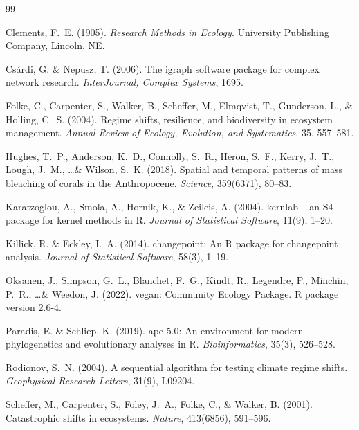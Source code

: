 \documentclass[12pt]{article}
\begin{document}
\begin{thebibliography}{99}

Clements, F.~E. (1905).
\newblock \emph{Research Methods in Ecology}.
\newblock University Publishing Company, Lincoln, NE.

Cs\'{a}rdi, G. \& Nepusz, T. (2006).
\newblock The igraph software package for complex network research.
\newblock \emph{InterJournal, Complex Systems}, 1695.

Folke, C., Carpenter, S., Walker, B., Scheffer, M., Elmqvist, T., Gunderson, L., \& Holling, C.~S. (2004).
\newblock Regime shifts, resilience, and biodiversity in ecosystem management.
\newblock \emph{Annual Review of Ecology, Evolution, and Systematics}, 35, 557--581.

Hughes, T.~P., Anderson, K.~D., Connolly, S.~R., Heron, S.~F., Kerry, J.~T., Lough, J.~M., \ldots \& Wilson, S.~K. (2018).
\newblock Spatial and temporal patterns of mass bleaching of corals in the {Anthropocene}.
\newblock \emph{Science}, 359(6371), 80--83.

Karatzoglou, A., Smola, A., Hornik, K., \& Zeileis, A. (2004).
\newblock kernlab -- an {S4} package for kernel methods in {R}.
\newblock \emph{Journal of Statistical Software}, 11(9), 1--20.

Killick, R. \& Eckley, I.~A. (2014).
\newblock changepoint: An {R} package for changepoint analysis.
\newblock \emph{Journal of Statistical Software}, 58(3), 1--19.

Oksanen, J., Simpson, G.~L., Blanchet, F.~G., Kindt, R., Legendre, P., Minchin, P.~R., \ldots \& Weedon, J. (2022).
\newblock vegan: Community Ecology Package.
\newblock R package version 2.6-4.

Paradis, E. \& Schliep, K. (2019).
\newblock ape 5.0: An environment for modern phylogenetics and evolutionary analyses in {R}.
\newblock \emph{Bioinformatics}, 35(3), 526--528.

Rodionov, S.~N. (2004).
\newblock A sequential algorithm for testing climate regime shifts.
\newblock \emph{Geophysical Research Letters}, 31(9), L09204.

Scheffer, M., Carpenter, S., Foley, J.~A., Folke, C., \& Walker, B. (2001).
\newblock Catastrophic shifts in ecosystems.
\newblock \emph{Nature}, 413(6856), 591--596.


\end{thebibliography}
\end{document}
